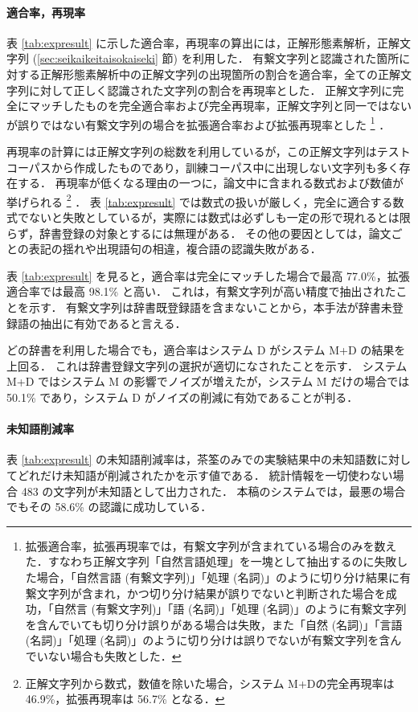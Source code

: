 \paragraph{適合率，再現率}
\label{sec:expresultprf}
表 \ref{tab:expresult} に示した適合率，再現率の算出には，正解形態素解析，正解文字列 (\ref{sec:seikaikeitaisokaiseki} 節) を利用した．
有繋文字列と認識された箇所に対する正解形態素解析中の正解文字列の出現箇所の割合を適合率，全ての正解文字列に対して正しく認識された文字列の割合を再現率とした．
正解文字列に完全にマッチしたものを完全適合率および完全再現率，正解文字列と同一ではないが誤りではない有繋文字列の場合を拡張適合率および拡張再現率とした
\footnote{拡張適合率，拡張再現率では，有繋文字列が含まれている場合のみを数えた．すなわち正解文字列「自然言語処理」を一塊として抽出するのに失敗した場合，「自然言語 (有繋文字列)」「処理 (名詞)」のように切り分け結果に有繋文字列が含まれ，かつ切り分け結果が誤りでないと判断された場合を成功，「自然言 (有繋文字列)」「語 (名詞)」「処理 (名詞)」のように有繋文字列を含んでいても切り分け誤りがある場合は失敗，また「自然 (名詞)」「言語 (名詞)」「処理 (名詞)」のように切り分けは誤りでないが有繋文字列を含んでいない場合も失敗とした．}
．

再現率の計算には正解文字列の総数を利用しているが，この正解文字列はテストコーパスから作成したものであり，訓練コーパス中に出現しない文字列も多く存在する．
再現率が低くなる理由の一つに，論文中に含まれる数式および数値が挙げられる
\footnote{正解文字列から数式，数値を除いた場合，システム M+D\idl の完全再現率は 46.9\%，拡張再現率は 56.7\% となる．}
．
表 \ref{tab:expresult} では数式の扱いが厳しく，完全に適合する数式でないと失敗としているが，実際には数式は必ずしも一定の形で現れるとは限らず，辞書登録の対象とするには無理がある．
その他の要因としては，論文ごとの表記の揺れや出現語句の相違，複合語の認識失敗がある．

表 \ref{tab:expresult} を見ると，適合率は完全にマッチした場合で最高 77.0\%，拡張適合率では最高 98.1\% と高い．
これは，有繋文字列が高い精度で抽出されたことを示す．
有繋文字列は辞書既登録語を含まないことから，本手法が辞書未登録語の抽出に有効であると言える．

どの辞書を利用した場合でも，適合率はシステム D がシステム M+D の結果を上回る．
これは辞書登録文字列の選択が適切になされたことを示す．
システム M+D ではシステム M の影響でノイズが増えたが，システム M だけの場合では 50.1\% であり，システム D がノイズの削減に有効であることが判る．
\paragraph{未知語削減率}
\label{sec:expresultunk}
表 \ref{tab:expresult} の未知語削減率は，茶筌のみでの実験結果中の未知語数に対してどれだけ未知語が削減されたかを示す値である．
統計情報を一切使わない場合 483 の文字列が未知語として出力された．
本稿のシステムでは，最悪の場合でもその 58.6\% の認識に成功している．

